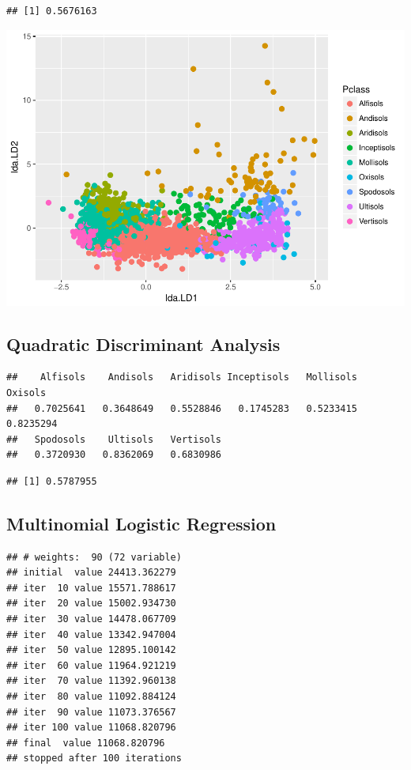 \documentclass[]{article}
\begin{document}
\begin{verbatim}
## [1] 0.5676163
\end{verbatim}

\includegraphics{Project1_files/figure-latex/LDA - Fei-1.pdf}

\subsection{Quadratic Discriminant
Analysis}\label{quadratic-discriminant-analysis}

\begin{verbatim}
##    Alfisols    Andisols   Aridisols Inceptisols   Mollisols     Oxisols 
##   0.7025641   0.3648649   0.5528846   0.1745283   0.5233415   0.8235294 
##   Spodosols    Ultisols   Vertisols 
##   0.3720930   0.8362069   0.6830986
\end{verbatim}

\begin{verbatim}
## [1] 0.5787955
\end{verbatim}

\subsection{Multinomial Logistic
Regression}\label{multinomial-logistic-regression}

\begin{verbatim}
## # weights:  90 (72 variable)
## initial  value 24413.362279 
## iter  10 value 15571.788617
## iter  20 value 15002.934730
## iter  30 value 14478.067709
## iter  40 value 13342.947004
## iter  50 value 12895.100142
## iter  60 value 11964.921219
## iter  70 value 11392.960138
## iter  80 value 11092.884124
## iter  90 value 11073.376567
## iter 100 value 11068.820796
## final  value 11068.820796 
## stopped after 100 iterations
\end{verbatim}
\end{document}
